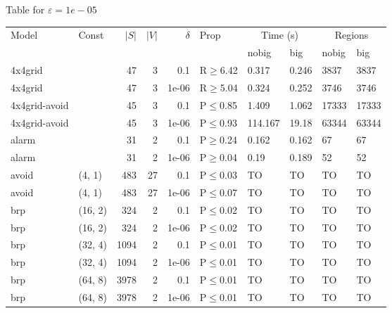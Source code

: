 \small Table for \(\varepsilon=1e-05\)
\begin{longtable}{llrrrlllll}

        \toprule
        Model & Const & $|S|$ & $|V|$ & $\delta$ & Prop & \multicolumn{2}{c}{Time (s)} & \multicolumn{2}{c}{Regions} \\
        \cmidrule(ll){7-8} \cmidrule(ll){9-10}
        & & & & & & nobig & big & nobig & big \\
        \midrule
        
 4x4grid       &           &     	47 &   3 & 0.1   & R$\geq$6.42  & 0.317    & 0.246    & 3837    & 3837    \\
 4x4grid       &           &     	47 &   3 & 1e-06 & R$\geq$5.04  & 0.324    & 0.252    & 3746    & 3746    \\
 4x4grid-avoid &           &     	45 &   3 & 0.1   & P$\leq$0.85  & 1.409    & 1.062    & 17333   & 17333   \\
 4x4grid-avoid &           &     	45 &   3 & 1e-06 & P$\leq$0.93  & 114.167  & 19.18    & 63344   & 63344   \\
 alarm         &           &     	31 &   2 & 0.1   & P$\geq$0.24  & 0.162    & 0.162    & 67      & 67      \\
 alarm         &           &     	31 &   2 & 1e-06 & P$\geq$0.04  & 0.19     & 0.189    & 52      & 52      \\
 avoid         & (4, 1)    &    	483 &  27 & 0.1   & P$\leq$0.03  & TO       & TO       & TO      & TO      \\
 avoid         & (4, 1)    &    	483 &  27 & 1e-06 & P$\leq$0.07  & TO       & TO       & TO      & TO      \\
 brp           & (16, 2)   &    	324 &   2 & 0.1   & P$\leq$0.02  & TO       & TO       & TO      & TO      \\
 brp           & (16, 2)   &    	324 &   2 & 1e-06 & P$\leq$0.02  & TO       & TO       & TO      & TO      \\
 brp           & (32, 4)   &   	1094 &   2 & 0.1   & P$\leq$0.01  & TO       & TO       & TO      & TO      \\
 brp           & (32, 4)   &   	1094 &   2 & 1e-06 & P$\leq$0.01  & TO       & TO       & TO      & TO      \\
 brp           & (64, 8)   &   	3978 &   2 & 0.1   & P$\leq$0.01  & TO       & TO       & TO      & TO      \\
 brp           & (64, 8)   &   	3978 &   2 & 1e-06 & P$\leq$0.01  & TO       & TO       & TO      & TO      \\

\end{longtable}
